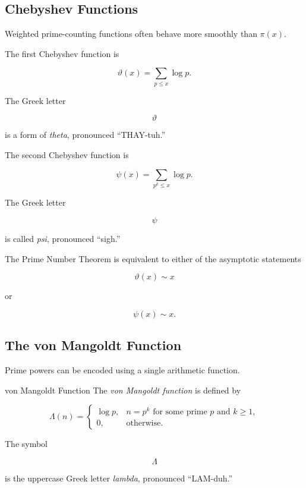 \subsection{Chebyshev Functions}
\label{subsec:chebyshev-functions}

Weighted prime-counting functions often behave more smoothly than
\(\pi(x)\).

The first Chebyshev function is

\[ \vartheta(x)=\sum_{p\leq x}\log p. \]

The Greek letter

\[ \vartheta \]

is a form of \emph{theta}, pronounced ``THAY-tuh.''

The second Chebyshev function is

\[ \psi(x)=\sum_{p^k\leq x}\log p. \]

The Greek letter

\[ \psi \]

is called \emph{psi}, pronounced ``sigh.''

The Prime Number Theorem is equivalent to either of the asymptotic statements

\[ \vartheta(x)\sim x \]

or

\[ \psi(x)\sim x. \]

\subsection{The von Mangoldt Function}
\label{subsec:von-mangoldt-function}

Prime powers can be encoded using a single arithmetic function.

\begin{definitionbox}{von Mangoldt Function}
The \emph{von Mangoldt function} is defined by

\[
\Lambda(n)=
\begin{cases}
\log p, & n=p^k \text{ for some prime }p\text{ and }k\geq1,\\
0, & \text{otherwise}.
\end{cases}
\]
\end{definitionbox}

The symbol

\[ \Lambda \]

is the uppercase Greek letter \emph{lambda}, pronounced ``LAM-duh.''


